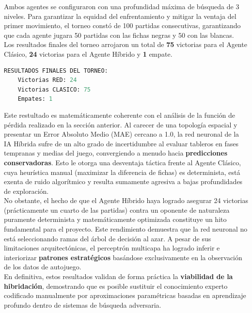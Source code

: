 \documentclass[conference]{IEEEtran}
\begin{document}
Ambos agentes se configuraron con una profundidad máxima de búsqueda de 3 niveles. Para garantizar la equidad del enfrentamiento y mitigar la ventaja del primer movimiento, el torneo 
constó de 100 partidas consecutivas, garantizando que cada agente jugara 50 partidas con las fichas negras y 50 con las blancas.\\

Los resultados finales del torneo arrojaron un total de \textbf{75} victorias para el Agente Clásico, \textbf{24} victorias para el Agente Híbrido y \textbf{1} empate.

\begin{lstlisting}[language=Python, caption={Resultado del script de evaluación del torneo.}, label={lst:resultado_torneo}]
RESULTADOS FINALES DEL TORNEO:
    Victorias RED: 24
    Victorias CLASICO: 75
    Empates: 1
\end{lstlisting}

Este restultado es matemáticamente coherente con el análisis de la función de pérdida realizado en la sección anterior. Al carecer de una topología espacial y presentar un Error Absoluto 
Medio (MAE) cercano a 1.0, la red neuronal de la IA Híbrida sufre de un alto grado de incertidumbre al evaluar tableros en fases tempranas y medias del juego, convergiendo a 
menudo hacia \textbf{predicciones conservadoras}. Esto le otorga una desventaja táctica frente al Agente Clásico, cuya heurística manual (maximizar la diferencia de fichas) es determinista, 
está exenta de ruido algorítmico y resulta sumamente agresiva a bajas profundidades de exploración.\\

No obstante, el hecho de que el Agente Híbrido haya logrado asegurar 24 victorias (prácticamente un cuarto de las partidas) contra un oponente de naturaleza puramente determinista y 
matemáticamente optimizada constituye un hito fundamental para el proyecto. Este rendimiento demuestra que la red neuronal no está seleccionando ramas del árbol 
de decisión al azar. A pesar de sus limitaciones arquitectónicas, el perceptrón multicapa ha logrado inferir e interiorizar \textbf{patrones estratégicos} basándose exclusivamente en la observación de los datos de autojuego. \\

En definitiva, estos resultados validan de forma práctica la \textbf{viabilidad de la hibridación}, demostrando que es posible sustituir el conocimiento experto codificado 
manualmente por aproximaciones paramétricas basadas en aprendizaje profundo dentro de sistemas de búsqueda adversaria.\\
\end{document}
